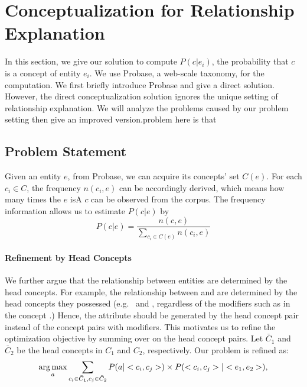 \section{Conceptualization for Relationship Explanation}
\label{sec:conceptualization}
In this section, we give our solution to compute $P(c|e_i)$, the probability that $c$ is a concept of entity $e_i$.
We use Probase, a web-scale taxonomy, for the computation. We first briefly introduce Probase and give a direct solution. However, the direct conceptualization solution ignores the unique setting of relationship explanation. We will analyze the problems caused by our problem setting then give an improved version.problem here is that

\subsection{Problem Statement}

Given an entity $e$, from Probase, we can acquire its concepts' set $C(e)$. For each $c_i \in C$, the frequency $n(c_i,e)$ can be accordingly derived, which means how many times the $e$ isA $c$ can be observed from the corpus. The frequency information allows us to estimate  $P(c|e)$ by
$$P(c|e)=\frac{n(c,e)}{\sum_{c_i\in C(e)}n(c_i, e)}$$


\paragraph{Refinement by Head Concepts}
We further argue that the relationship between entities are determined by the head concepts. For example, the  relationship between  and  are determined by the head concepts they possessed (e.g.\  and , regardless of the modifiers such as  in the concept .) Hence, the attribute should be generated by the head concept pair instead of the concept pairs with modifiers. This motivates us to refine the optimization objective by summing over on the head concept pairs. Let $\bar{C}_1$ and $\bar{C}_2$ be the head concepts in  $C_1$ and $C_2$, respectively. Our problem is refined as:
\begin{equation}
\label{eq:target}
\operatorname*{arg\,max}_a \sum_{c_i\in \bar{C}_1 , c_j \in \bar{C}_2 }P(a|<c_{i},c_{j}>)\times P(<c_{i},c_{j}>|<e_{1},e_{2}>),
\end{equation}

